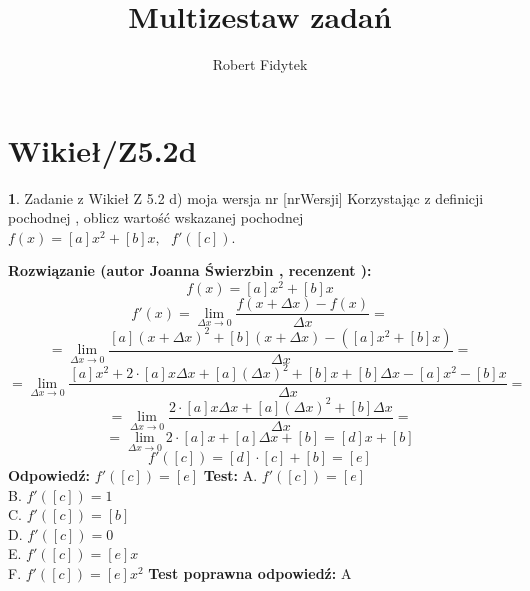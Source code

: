 \documentclass[12pt, a4paper]{article}
\title{Multizestaw zadań}
\author{Robert Fidytek}
\date{}
\theoremstyle{definition} %
\newtheorem{zad}{}
\newcommand{\kategoria}[1]{\section{#1}} %
\newcommand{\zadStart}[1]{\begin{zad}#1\newline} %
\newcommand{\zadStop}{\end{zad}}   %
\newcommand{\rozwStart}[2]{\noindent \textbf{Rozwiązanie (autor #1 , recenzent #2): }\newline} %
\newcommand{\rozwStop}{\newline}                                            %
\newcommand{\odpStart}{\noindent \textbf{Odpowiedź:}\newline}    %
\newcommand{\odpStop}{\newline}                                             %
\newcommand{\testStart}{\noindent \textbf{Test:}\newline} %
\newcommand{\testStop}{\newline} %
\newcommand{\kluczStart}{\noindent \textbf{Test poprawna odpowiedź:}\newline} %
\newcommand{\kluczStop}{\newline} %
\begin{document}
\maketitle


\kategoria{Wikieł/Z5.2d}
\zadStart{Zadanie z Wikieł Z 5.2 d) moja wersja nr [nrWersji]}
Korzystając z definicji pochodnej , oblicz wartość wskazanej pochodnej \\ $f(x)=[a]x^2+[b]x, \ \ \ f'([c])$.
\zadStop
\rozwStart{Joanna Świerzbin}{}
$$f(x)=[a]x^2+[b]x$$
$$f'(x)=\lim_{\Delta x \rightarrow 0} \frac{f(x+\Delta x)-f(x)}{\Delta x} = $$ 
$$= \lim_{\Delta x \rightarrow 0} \frac{[a](x+\Delta x)^2+[b](x+\Delta x) -([a]x^2+[b]x)}{\Delta x}= $$ $$ =
 \lim_{\Delta x \rightarrow 0}  \frac{[a]x^2+2 \cdot [a] x \Delta x+ [a] (\Delta x)^2+[b]x+[b]\Delta x -[a]x^2-[b]x}{\Delta x} =$$
 $$ = \lim_{\Delta x \rightarrow 0}  \frac{2 \cdot [a] x \Delta x+ [a] (\Delta x)^2+[b]\Delta x }{\Delta x} =$$
 $$ = \lim_{\Delta x \rightarrow 0}  {2 \cdot [a] x + [a] \Delta x+[b]} = [d]x+[b]$$
$$f'([c])=[d]\cdot [c]+[b] = [e]$$
\rozwStop
\odpStart
$f'([c])= [e]$
\odpStop
\testStart
A. $f'([c])= [e]$\\
B. $f'([c])=1$ \\
C. $f'([c])=[b]$  \\
D. $f'([c])=0$\\
E. $f'([c])=[e]x$\\
F. $f'([c])=[e]x^2$
\testStop
\kluczStart
A
\kluczStop
\end{document}
